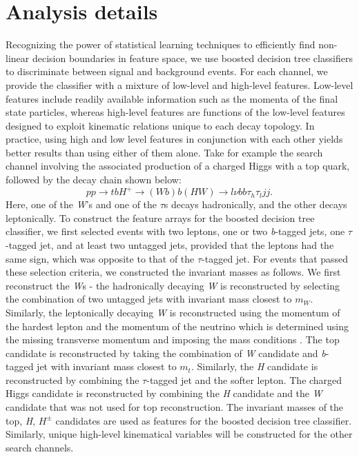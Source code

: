 \section{Analysis details}
Recognizing the power of statistical learning techniques to efficiently find non-linear decision boundaries in feature space, we use boosted decision tree classifiers to discriminate between signal and background events. For each channel, we provide the classifier with a mixture of low-level and high-level features. Low-level features include readily available information such as the momenta of the final state particles, whereas high-level features are functions of the low-level features designed to exploit kinematic relations unique to each decay topology. In practice, using high and low level features in conjunction with each other yields better results than using either of them alone. Take for example the search channel involving the associated production of a charged Higgs with a top quark, followed by the decay chain shown below:
\[pp\rightarrow tbH^+\rightarrow (Wb)b(HW)\rightarrow l\nu bb\tau_h\tau_ljj.\]
Here, one of the \emph{W}'s and one of the $\tau$s decays hadronically, and the other decays leptonically. To construct the feature arrays for the boosted decision tree classifier, we first selected events with two leptons, one or two \emph{b}-tagged jets, one $\tau$-tagged jet, and at least two untagged jets, provided that the leptons had the same sign, which was opposite to that of the $\tau$-tagged jet. For events that passed these selection criteria, we constructed the invariant masses as follows.
We first reconstruct the \emph{W}s - the hadronically decaying \emph{W} is reconstructed by selecting the combination of two untagged jets with invariant mass closest to $m_W$. Similarly, the leptonically decaying \emph{W} is reconstructed using the momentum of the hardest lepton and the momentum of the neutrino which is determined using the missing transverse momentum and imposing the mass conditions \cite{Aad:2012ux}. The top candidate is reconstructed by taking the combination of \emph{W} candidate and \emph{b}-tagged jet with invariant mass closest to $m_t$. Similarly, the \emph{H} candidate is reconstructed by combining the $\tau$-tagged jet and the softer lepton. The charged Higgs candidate is reconstructed by combining the \emph{H} candidate and the \emph{W} candidate that was not used for top reconstruction. The invariant masses of the top, \emph{H}, $H^\pm$ candidates are used as features for the boosted decision tree classifier. Similarly, unique high-level kinematical variables will be constructed for the other search channels.

